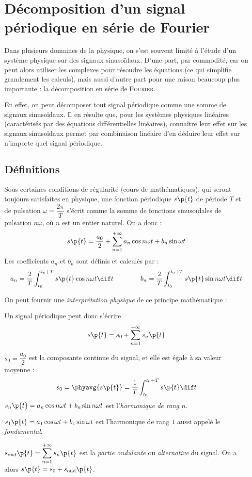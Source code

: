     \chaptertoc
    
    \section{Décomposition d'un signal périodique en série de Fourier}
    
    Dans plusieurs domaines de la physique, on s'est souvent limité à l'étude d'un système physique sur des signaux sinusoïdaux. D'une part, par commodité, car on peut alors utiliser les complexes pour résoudre les équations (ce qui simplifie grandement les calculs), mais aussi d'autre part pour une raison beaucoup plus importante : la décomposition en série de \textsc{Fourier}.
    
    En effet, on peut décomposer tout signal périodique comme une somme de signaux sinusoïdaux. Il en résulte que, pour les systèmes physiques linéaires (caractérisés par des équations différentielles linéaires), connaître leur effet sur les signaux sinusoïdaux permet par combinaison linéaire d'en déduire leur effet sur n'importe quel signal périodique.
    
    \subsection{Définitions}
    
    Sous certaines conditions de régularité (\cf cours de mathématiques), qui seront toujours satisfaites en physique, une fonction périodique $s\p{t}$ de période $T$ et de pulsation $\omega = \dfrac{2\pi}{T}$ s'écrit comme la somme de fonctions sinusoïdales de pulsation $n\omega$, où $n$ est un entier naturel. On a donc :
    \[ s\p{t} = \dfrac{a_0}{2} + \sum_{n=1}^{+\infty} a_n\cos{n\omega t} + b_n\sin{\omega t}\]
    Les coefficients $a_n$ et $b_n$ sont définis et calculés par :
    \[ a_n = \dfrac{2}{T}\int_{t_0}^{t_0 + T} s\p{t}\cos{n\omega t}\dif t \qquad\qquad b_n = \dfrac{2}{T} \int_{t_0}^{t_0 + T} s\p{t}\sin{n\omega t}\dif t \]
    
    On peut fournir une \textit{interprétation physique} de ce principe mathématique :
    \begin{enumerate}
        \itt Un signal périodique peut donc s'écrire
        \[ s\p{t} = s_0 + \sum_{n=1}^{+\infty} s_n\p{t}\]
        
        \itt $s_0 = \dfrac{a_0}{2}$ est la composante continue du signal, et elle est égale à sa valeur moyenne :
        \[ s_0 = \phyavg{s\p{t}} = \dfrac{1}{T}\int_{t_0}^{t_0 + T}s\p{t}\dif t\]
        \itt $s_n\p{t} = a_n\cos{n\omega t} + b_n\sin{n\omega t}$ est l'\textit{harmonique de rang $n$}.
        
        \itt $s_1\p{t} = a_1\cos{\omega t} + b_1\sin{\omega t}$ est l'harmonique de rang $1$ aussi appelé le \textit{fondamental}.
        
        \itt $s_\text{ond}\p{t} = \displaystyle \sum_{n=1}^{+\infty} s_n\p{t}$ est la \textit{partie ondulante} ou \textit{alternative} du signal. On a alors $s\p{t} = s_0 + s_\text{ond}\p{t}$.
    \end{enumerate}
    
